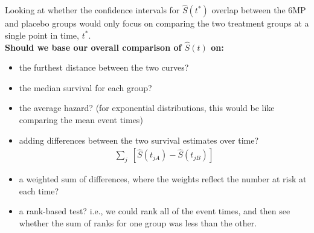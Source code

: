 \documentclass[envcountsect, 10pt, portrait, palatino]{beamer}
\begin{document}
\begin{frame}
Looking at whether the confidence intervals for $\hat{S}(t^{*})$ overlap between the 6MP and placebo groups
would only focus on comparing the two treatment
groups at a single point in time, $t^{*}$.
\\[2ex]
{\bf Should we base our overall comparison of $\hat{S}(t)$ on:}
\small
\begin{itemize}
\item the furthest distance between the two curves?
\item the median survival for each group?
\item the average hazard? (for exponential distributions, this would
be like comparing the mean event times)
\item adding differences between the two survival estimates
over time?
\begin{eqnarray*}
\sum_j \; \left[\hat{S}(t_{jA}) - \hat{S}(t_{jB})\right]
\end{eqnarray*}
\vspace*{-.3in}

\item a weighted sum of differences, where the weights reflect the
number at risk at each time?
\item a rank-based test?  i.e., we could rank all of the event times,
and then see whether the sum of ranks for one group was less than the
other.
\end{itemize}
\normalsize
\end{frame}
\end{document}
